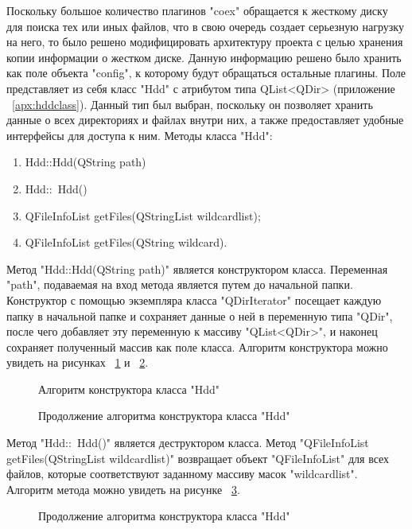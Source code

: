 Поскольку большое количество плагинов "coex" обращается к жесткому диску для поиска тех или иных файлов, что в свою очередь создает серьезную нагрузку на него, то было решено модифицировать архитектуру проекта с целью хранения копии информации о жестком диске. Данную информацию решено было хранить как поле объекта "config", к которому будут обращаться остальные плагины. Поле представляет из себя класс "Hdd" с атрибутом типа QList<QDir> (приложение ~\ref{apx:hddclass}). Данный тип был выбран, поскольку он позволяет хранить данные о всех директориях и файлах внутри них, а также предоставляет удобные интерфейсы для доступа к ним. Методы класса "Hdd":

\begin{enumerate}
  \item Hdd::Hdd(QString path)
  \item Hdd::~Hdd()
  \item QFileInfoList getFiles(QStringList wildcardlist);
  \item QFileInfoList getFiles(QString wildcard).
\end{enumerate}

Метод "Hdd::Hdd(QString path)" является конструктором класса. Переменная "path", подаваемая на вход метода является путем до начальной папки. Конструктор с помощью экземпляра класса "QDirIterator" посещает каждую папку в начальной папке и сохраняет данные о ней в переменную типа "QDir", после чего добавляет эту переменную к массиву "QList<QDir>", и наконец сохраняет полученный массив как поле класса. Алгоритм конструктора можно увидеть на рисунках ~\ref{bok_6:bok_6} и ~\ref{bok_7:bok_7}.

\begin{figure}[!ht]
\caption{ Алгоритм конструктора класса "Hdd" }
\label{bok_6:bok_6}
\end{figure}

\begin{figure}[!ht]
\caption{ Продолжение алгоритма конструктора класса "Hdd" }
\label{bok_7:bok_7}
\end{figure}

Метод "Hdd::~Hdd()" является деструктором класса.
Метод "QFileInfoList getFiles(QStringList wildcardlist)" возвращает объект "QFileInfoList" для всех файлов, которые соответствуют заданному массиву масок "wildcardlist". Алгоритм метода можно увидеть на рисунке ~\ref{bok_9:bok_9}.

\begin{figure}[!ht]
\caption{ Продолжение алгоритма конструктора класса "Hdd" }
\label{bok_9:bok_9}
\end{figure}

